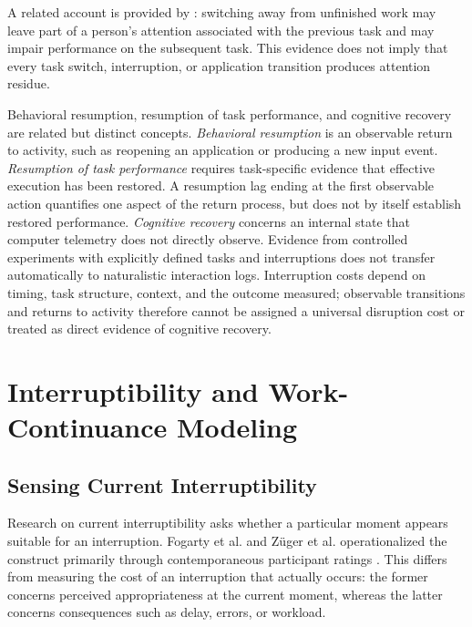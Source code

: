 A related account is provided by \textcite{leroy2009attentionResidue}: switching away from unfinished work may leave part of a person's attention associated with the previous task and may impair performance on the subsequent task. This evidence does not imply that every task switch, interruption, or application transition produces attention residue.

Behavioral resumption, resumption of task performance, and cognitive recovery are related but distinct concepts. \emph{Behavioral resumption} is an observable return to activity, such as reopening an application or producing a new input event. \emph{Resumption of task performance} requires task-specific evidence that effective execution has been restored. A resumption lag ending at the first observable action quantifies one aspect of the return process, but does not by itself establish restored performance. \emph{Cognitive recovery} concerns an internal state that computer telemetry does not directly observe. Evidence from controlled experiments with explicitly defined tasks and interruptions does not transfer automatically to naturalistic interaction logs. Interruption costs depend on timing, task structure, context, and the outcome measured; observable transitions and returns to activity therefore cannot be assigned a universal disruption cost or treated as direct evidence of cognitive recovery.

\section{Interruptibility and Work-Continuance Modeling}

\subsection{Sensing Current Interruptibility}

Research on current interruptibility asks whether a particular moment appears suitable for an interruption. Fogarty et al. and Züger et al. operationalized the construct primarily through contemporaneous participant ratings \parencite{fogarty2005interruptibility,zueger2018sensing}. This differs from measuring the cost of an interruption that actually occurs: the former concerns perceived appropriateness at the current moment, whereas the latter concerns consequences such as delay, errors, or workload.


